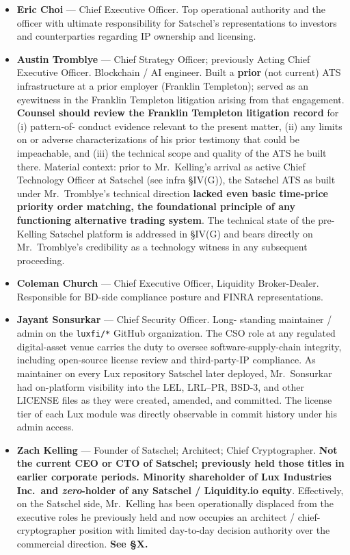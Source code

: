\documentclass[11pt,letterpaper]{article}
\begin{document}
\begin{itemize}[leftmargin=1.5em,itemsep=0.2em]
\item \textbf{Eric Choi} --- Chief Executive Officer. Top operational
authority and the officer with ultimate responsibility for Satschel's
representations to investors and counterparties regarding IP ownership
and licensing.
\item \textbf{Austin Tromblye} --- Chief Strategy Officer; previously
Acting Chief Executive Officer. Blockchain / AI engineer. Built a
\textbf{prior} (not current) ATS infrastructure at a prior employer
(Franklin Templeton); served as an eyewitness in the Franklin Templeton
litigation arising from that engagement. \textbf{Counsel should
review the Franklin Templeton litigation record} for (i) pattern-of-
conduct evidence relevant to the present matter, (ii) any limits on or
adverse characterizations of his prior testimony that could be
impeachable, and (iii) the technical scope and quality of the ATS he
built there. Material context: prior to Mr.\ Kelling's arrival as
active Chief Technology Officer at Satschel (see infra \S IV(G)),
the Satschel ATS as built under Mr.\ Tromblye's technical direction
\textbf{lacked even basic time-price priority order matching, the
foundational principle of any functioning alternative trading
system}. The technical state of the pre-Kelling Satschel platform is
addressed in \S IV(G) and bears directly on Mr.\ Tromblye's
credibility as a technology witness in any subsequent proceeding.
\item \textbf{Coleman Church} --- Chief Executive Officer, Liquidity
Broker-Dealer. Responsible for BD-side compliance posture and FINRA
representations.
\item \textbf{Jayant Sonsurkar} --- Chief Security Officer. Long-
standing maintainer / admin on the \texttt{luxfi/*} GitHub organization.
The CSO role at any regulated digital-asset venue carries the duty to
oversee software-supply-chain integrity, including open-source license
review and third-party-IP compliance. As maintainer on every Lux
repository Satschel later deployed, Mr.\ Sonsurkar had on-platform
visibility into the LEL, LRL--PR, BSD-3, and other LICENSE files as
they were created, amended, and committed. The license tier of each
Lux module was directly observable in commit history under his admin
access.
\item \textbf{Zach Kelling} --- Founder of Satschel; Architect; Chief
Cryptographer. \textbf{Not the current CEO or CTO of Satschel;
previously held those titles in earlier corporate periods. Minority
shareholder of Lux Industries Inc.\ and \emph{zero}-holder of any
Satschel / Liquidity.io equity}. Effectively, on the Satschel side,
Mr.\ Kelling has been operationally displaced from the executive
roles he previously held and now occupies an architect / chief-
cryptographer position with limited day-to-day decision authority over
the commercial direction. \textbf{See \S X.}
\end{itemize}
\end{document}
